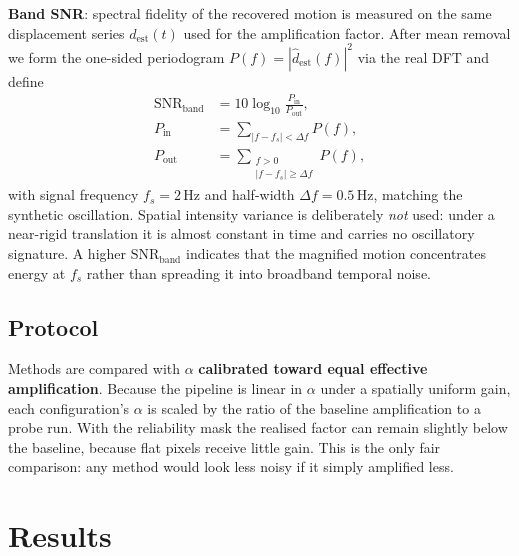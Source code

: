 \documentclass[conference]{IEEEtran}
\begin{document}
\textbf{Band SNR}: spectral fidelity of the recovered motion is measured on
the same displacement series $d_{\mathrm{est}}(t)$ used for the amplification
factor. After mean removal we form the one-sided periodogram
$P(f)=|\widehat{d}_{\mathrm{est}}(f)|^2$ via the real DFT and define
\[
\begin{aligned}
\mathrm{SNR}_{\mathrm{band}}
  &= 10\log_{10}\!\frac{P_{\mathrm{in}}}{P_{\mathrm{out}}},\\
P_{\mathrm{in}}
  &= \sum_{|f-f_s|<\Delta f} P(f),\\
P_{\mathrm{out}}
  &= \sum_{\substack{f>0\\ |f-f_s|\geq\Delta f}} P(f),
\end{aligned}
\]
with signal frequency $f_s=2$\,Hz and half-width $\Delta f=0.5$\,Hz, matching
the synthetic oscillation. Spatial intensity variance is deliberately
\emph{not} used: under a near-rigid translation it is almost constant in
time and carries no oscillatory signature. A higher
$\mathrm{SNR}_{\mathrm{band}}$ indicates that the magnified motion
concentrates energy at $f_s$ rather than spreading it into broadband temporal
noise.

\subsection{Protocol}
Methods are compared with $\alpha$ \textbf{calibrated toward equal effective
amplification}. Because the pipeline is linear in $\alpha$ under a spatially
uniform gain, each configuration's $\alpha$ is scaled by the ratio of the
baseline amplification to a probe run. With the reliability mask the realised
factor can remain slightly below the baseline, because flat pixels receive
little gain. This is the only fair comparison: any method would look less
noisy if it simply amplified less.

\section{Results}
\end{document}
